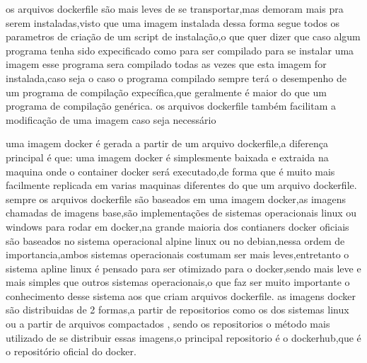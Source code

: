 \documentclass[
	12pt,				%
	openright,			%
	oneside,			%
	a4paper,			%
	english,			%
	french,				%
	spanish,			%
	brazil,				%
	]{abntex2}
\begin{document}
os arquivos dockerfile são mais leves de se transportar,mas demoram mais pra serem instaladas,visto que uma imagem instalada dessa forma segue todos os parametros de criação de um script de instalação,o que quer dizer que caso algum programa tenha sido expecificado como para ser compilado para se instalar uma imagem esse programa sera compilado todas as vezes que esta imagem for instalada,caso seja o caso o programa compilado sempre terá o desempenho de um programa de compilação expecífica,que geralmente é maior do que um programa de compilação genérica.
os arquivos dockerfile também facilitam a modificação de uma imagem caso seja necessário


uma imagem docker é gerada a partir de um arquivo dockerfile,a diferença principal é que: uma imagem docker é simplesmente baixada e extraida na maquina onde o container docker será executado,de forma que é muito mais facilmente replicada em varias maquinas diferentes do que um arquivo dockerfile.
sempre os arquivos dockerfile são baseados em uma imagem docker,as imagens chamadas de imagens base,são implementações de sistemas operacionais linux ou windows para rodar em docker,na grande maioria dos contianers docker oficiais são baseados no sistema operacional alpine linux ou no debian,nessa ordem de importancia,ambos sistemas operacionais costumam ser mais leves,entretanto o sistema apline linux é pensado para ser otimizado para o docker,sendo mais leve e mais simples que outros sistemas operacionais,o que faz ser muito importante o conhecimento desse sistema aos que criam arquivos dockerfile.
as imagens docker são distribuidas de 2 formas,a partir de repositorios como os dos sistemas linux ou a partir de arquivos compactados , sendo os repositorios o método mais utilizado de se distribuir essas imagens,o principal repositorio é o dockerhub,que é o repositório oficial do docker.


\cite{dockercomposedoc}
\end{document}
